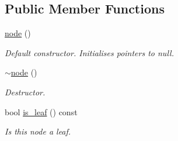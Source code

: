\subsection*{Public Member Functions}
\begin{DoxyCompactItemize}
\item 
\mbox{\label{structphysim_1_1structures_1_1object__partition_1_1node_afeabfca825a2b137ebad1737f75617d3}} 
\hyperlink{structphysim_1_1structures_1_1object__partition_1_1node_afeabfca825a2b137ebad1737f75617d3}{node} ()
\begin{DoxyCompactList}\small\item\em Default constructor. Initialises pointers to null. \end{DoxyCompactList}\item 
\mbox{\label{structphysim_1_1structures_1_1object__partition_1_1node_a69a6a2782d442c3fbf8412702523505d}} 
\hyperlink{structphysim_1_1structures_1_1object__partition_1_1node_a69a6a2782d442c3fbf8412702523505d}{$\sim$node} ()
\begin{DoxyCompactList}\small\item\em Destructor. \end{DoxyCompactList}\item 
bool \hyperlink{structphysim_1_1structures_1_1object__partition_1_1node_a050a9a5a4fce3e677a524cba652d8ab9}{is\+\_\+leaf} () const
\begin{DoxyCompactList}\small\item\em Is this node a leaf. \end{DoxyCompactList}\end{DoxyCompactItemize}
